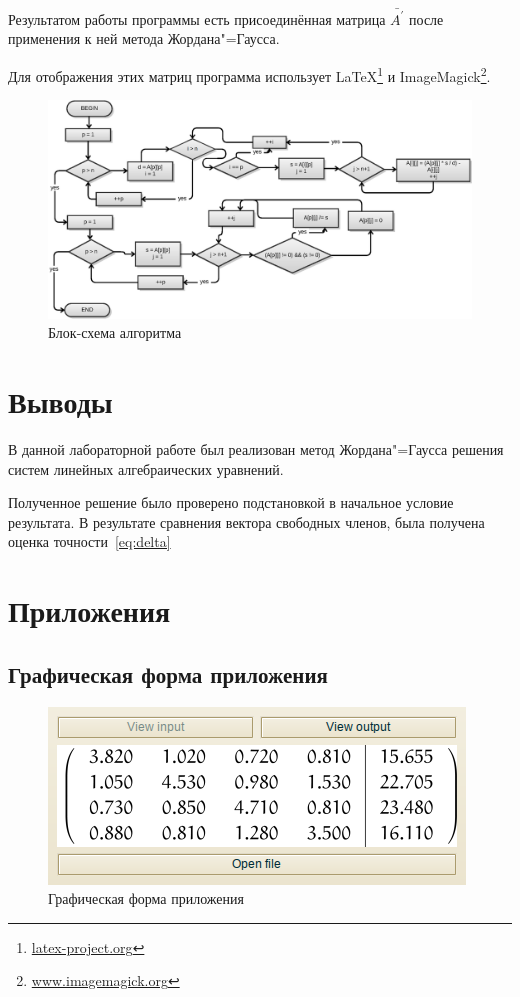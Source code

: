 \documentclass[a4paper,12pt,notitlepage,headsepline,pdftex]{scrartcl}
\begin{document}
  Результатом работы программы есть присоединённая матрица $\bar{A^\prime}$
  после применения к ней метода Жордана"=Гаусса.

  Для отображения этих матриц программа использует
  \LaTeX{}\footnote{\url{latex-project.org}} и
  ImageMagick\footnote{\url{www.imagemagick.org}}.


  \begin{landscape}
    \begin{figure}[h]
      \begin{center}
        \includegraphics[scale=0.85]{flowchart.eps}
      \end{center}
      \caption{Блок-схема алгоритма}
      \label{fig:flowchart}
    \end{figure}
  \end{landscape}

\section{Выводы}
  В данной лабораторной работе был реализован метод Жордана"=Гаусса решения
  систем линейных алгебраических уравнений.

  Полученное решение было проверено подстановкой в начальное условие
  результата.
  В результате сравнения вектора свободных членов, была получена оценка
  точности~\eqref{eq:delta}
\newpage
\section{Приложения}
  \subsection{Графическая форма приложения}
    \begin{figure}[h]
      \begin{center}
        \includegraphics{screenshot.png}
      \end{center}
      \caption{Графическая форма приложения}
      \label{fig:gui}
    \end{figure}
    \clearpage
\end{document}
